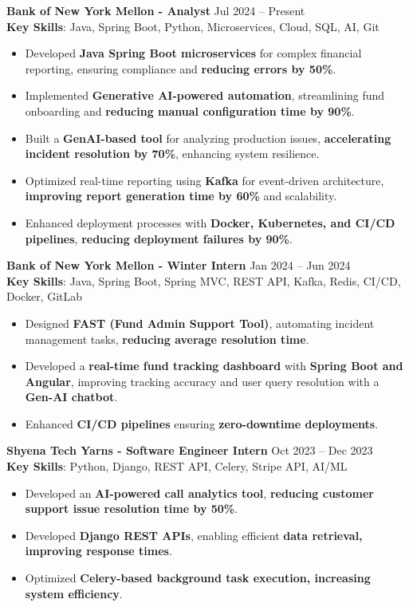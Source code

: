\documentclass[a4paper,10pt]{article}
\begin{document}
\textbf{Bank of New York Mellon - Analyst} \hfill Jul 2024 -- Present\\
\textbf{Key Skills}: Java, Spring Boot, Python, Microservices, Cloud, SQL, AI, Git
\begin{itemize}
    \item Developed \textbf{Java Spring Boot microservices} for complex financial reporting, ensuring compliance and \textbf{reducing errors by 50\%}.
    \item Implemented \textbf{Generative AI-powered automation}, streamlining fund onboarding and \textbf{reducing manual configuration time by 90\%}.
    \item Built a \textbf{GenAI-based tool} for analyzing production issues, \textbf{accelerating incident resolution by 70\%}, enhancing system resilience.
    \item Optimized real-time reporting using \textbf{Kafka} for event-driven architecture, \textbf{improving report generation time by 60\%} and scalability.
    \item Enhanced deployment processes with \textbf{Docker, Kubernetes, and CI/CD pipelines}, \textbf{reducing deployment failures by 90\%}.
\end{itemize}
\vspace{3pt}
\textbf{Bank of New York Mellon - Winter Intern} \hfill Jan 2024 -- Jun 2024\\
\textbf{Key Skills}: Java, Spring Boot, Spring MVC, REST API, Kafka, Redis, CI/CD, Docker, GitLab
\begin{itemize}
    \item Designed \textbf{FAST (Fund Admin Support Tool)}, automating incident management tasks, \textbf{reducing average resolution time}.
    \item Developed a \textbf{real-time fund tracking dashboard} with \textbf{Spring Boot and Angular}, improving tracking accuracy and user query resolution with a \textbf{Gen-AI chatbot}.
    \item Enhanced \textbf{CI/CD pipelines} ensuring \textbf{zero-downtime deployments}.
\end{itemize}
\vspace{3pt}
\textbf{Shyena Tech Yarns - Software Engineer Intern} \hfill Oct 2023 -- Dec 2023\\
\textbf{Key Skills}: Python, Django, REST API, Celery, Stripe API, AI/ML
\begin{itemize}
    \item Developed an \textbf{AI-powered call analytics tool}, \textbf{reducing customer support issue resolution time by 50\%}.
    \item Developed \textbf{Django REST APIs}, enabling efficient \textbf{data retrieval, improving response times}.
    \item Optimized \textbf{Celery-based background task execution, increasing system efficiency}.
\end{itemize}
\vspace{3pt}
\end{document}
